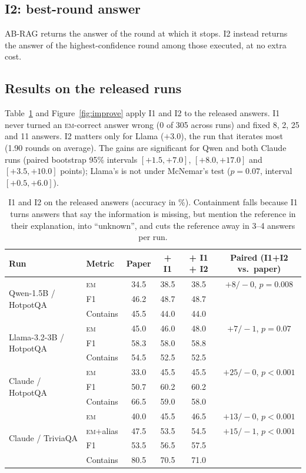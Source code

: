\documentclass[11pt]{article}
\newcommand{\EM}{\textsc{em}}
\begin{document}
\subsection{I2: best-round answer}

AB-RAG returns the answer of the round at which it stops. I2 instead returns the answer of the highest-confidence round among those executed, at no extra cost.

\subsection{Results on the released runs}

Table~\ref{tab:improve} and Figure~\ref{fig:improve} apply I1 and I2 to the released answers. I1 never turned an \EM{}-correct answer wrong (0 of 305 across runs) and fixed 8, 2, 25 and 11 answers. I2 matters only for Llama ($+3.0$), the run that iterates most (1.90 rounds on average). The gains are significant for Qwen and both Claude runs (paired bootstrap 95\% intervals $[+1.5, +7.0]$, $[+8.0, +17.0]$ and $[+3.5, +10.0]$ points); Llama's is not under McNemar's test ($p=0.07$, interval $[+0.5, +6.0]$).

\begin{table}[t]
\centering
\small
\begin{tabular}{llcccc}
\toprule
Run & Metric & Paper & + I1 & + I1 + I2 & Paired (I1+I2 vs.\ paper) \\
\midrule
\multirow{3}{*}{Qwen-1.5B / HotpotQA} & \EM{} & 34.5 & 38.5 & 38.5 & $+8/-0$, $p=0.008$ \\
& F1 & 46.2 & 48.7 & 48.7 & \\
& Contains & 45.5 & 44.0 & 44.0 & \\
\midrule
\multirow{3}{*}{Llama-3.2-3B / HotpotQA} & \EM{} & 45.0 & 46.0 & 48.0 & $+7/-1$, $p=0.07$ \\
& F1 & 58.3 & 58.0 & 58.8 & \\
& Contains & 54.5 & 52.5 & 52.5 & \\
\midrule
\multirow{3}{*}{Claude / HotpotQA} & \EM{} & 33.0 & 45.5 & 45.5 & $+25/-0$, $p<0.001$ \\
& F1 & 50.7 & 60.2 & 60.2 & \\
& Contains & 66.5 & 59.0 & 58.0 & \\
\midrule
\multirow{4}{*}{Claude / TriviaQA} & \EM{} & 40.0 & 45.5 & 46.5 & $+13/-0$, $p<0.001$ \\
& \EM{}+alias & 47.5 & 53.5 & 54.5 & $+15/-1$, $p<0.001$ \\
& F1 & 53.5 & 56.5 & 57.5 & \\
& Contains & 80.5 & 70.5 & 71.0 & \\
\bottomrule
\end{tabular}
\caption{I1 and I2 on the released answers (accuracy in \%). Containment falls because I1 turns answers that say the information is missing, but mention the reference in their explanation, into ``unknown'', and cuts the reference away in 3--4 answers per run.}
\label{tab:improve}
\end{table}
\end{document}
